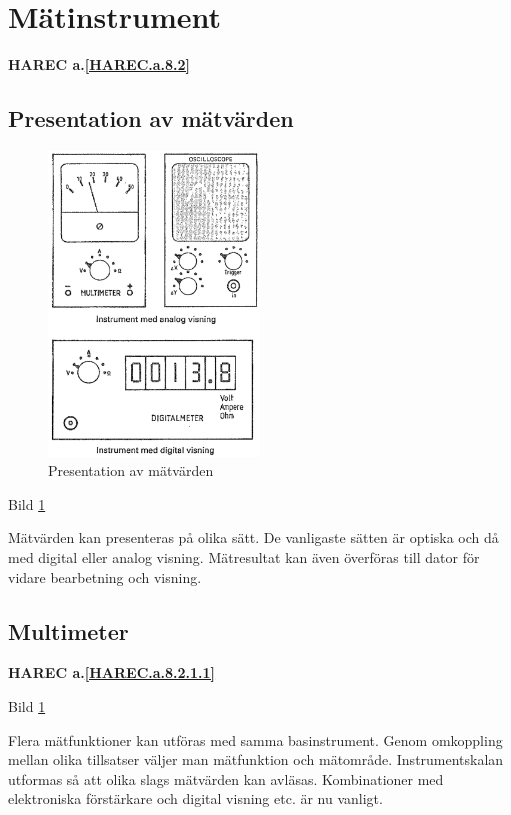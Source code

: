 \section{Mätinstrument}
\textbf{
  HAREC a.\ref{HAREC.a.8.2}\label{myHAREC.a.8.2}
}

\subsection{Presentation av mätvärden}

\begin{figure}
  \includegraphics[width=0.5\textwidth]{images/cropped_pdfs/bild_2_8-02.pdf}
  \caption{Presentation av mätvärden}
  \label{fig:bildII8-2}
\end{figure}

Bild \ref{fig:bildII8-2}

Mätvärden kan presenteras på olika sätt. De vanligaste sätten är
optiska och då med digital eller analog visning. Mätresultat kan även
överföras till dator för vidare bearbetning och visning.

\subsection{Multimeter}
\textbf{
HAREC a.\ref{HAREC.a.8.2.1.1}\label{myHAREC.a.8.2.1.1}
}

Bild \ref{fig:bildII8-2}

Flera mätfunktioner kan utföras med samma basinstrument. Genom
omkoppling mellan olika tillsatser väljer man mätfunktion och
mätområde. Instrumentskalan utformas så att olika slags mätvärden kan
avläsas.  Kombinationer med elektroniska förstärkare och digital
visning etc. är nu vanligt.

